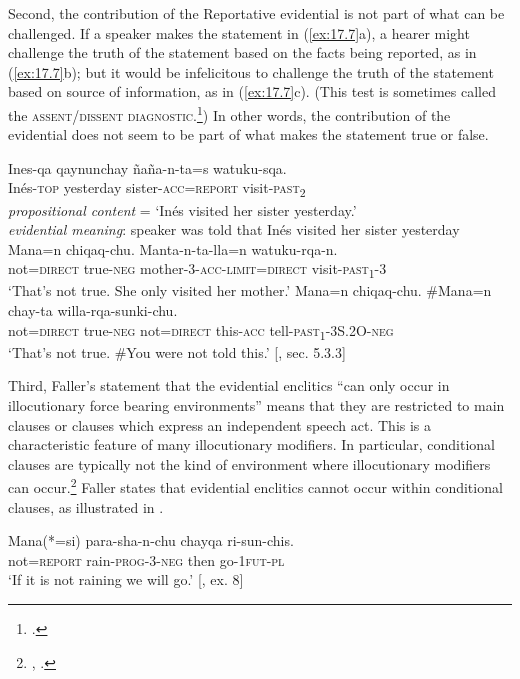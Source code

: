 Second, the contribution of the Reportative evidential is not part of what can be challenged. If a speaker makes the statement in (\ref{ex:17.7}a), a hearer might challenge the truth of the statement based on the facts being reported, as in (\ref{ex:17.7}b); but it would be infelicitous to challenge the truth of the statement based on source of information, as in (\ref{ex:17.7}c). (This test is sometimes called the \textsc{assent/dissent diagnostic}.\footnote{\citet{Papafragou2006}.}) In other words, the contribution of the evidential does not seem to be part of what makes the statement true or false.


\ea \label{ex:17.7}
\ea 
\gll Ines-qa  qaynunchay  ñaña-n-ta=s  watuku-sqa.\\
Inés-\textsc{top}  yesterday  sister-\textsc{acc}=\textsc{report}  visit\textsc{-past}\textsc{\textsubscript{2}}\\
\glt \textit{propositional content} = ‘Inés visited her sister yesterday.’\\
\textit{evidential meaning}: speaker was told that Inés visited her sister yesterday
\ex \gll  Mana=n  chiqaq-chu.  Manta-n-ta-lla=n  watuku-rqa-n.\\
not=\textsc{direct}  true-\textsc{neg}  mother-3-\textsc{acc}-\textsc{limit}=\textsc{direct}  visit-\textsc{past\textsubscript{1}}-3\\
\glt ‘That’s not true. She only visited her mother.’
\ex \gll  Mana=n  chiqaq-chu.  \#Mana=n  chay-ta  willa-rqa-sunki-chu.\\
not=\textsc{direct}  true-\textsc{neg}  not=\textsc{direct}  this-\textsc{acc}  tell\textsc{-past}\textsc{\textsubscript{1}}-3S.2O-\textsc{neg}\\
\glt ‘That’s not true. \#You were not told this.’  [\citealt{Faller2002}, sec. 5.3.3]
\z \z


Third, Faller’s statement that the evidential enclitics “can only occur in illocutionary force bearing environments” means that they are restricted to main clauses or clauses which express an independent speech act. This is a characteristic feature of many illocutionary modifiers. In particular, conditional clauses are typically not the kind of environment where illocutionary modifiers can occur.\footnote{\citet{Ernst2009}, \citet{Haegeman2010a}.} Faller states that evidential enclitics cannot occur within conditional clauses, as illustrated in .


\ea \label{ex:17.8}
\gll Mana(*=si)  para-sha-n-chu  chayqa  ri-sun-chis.\\
not=\textsc{report}  rain-\textsc{prog}-3-\textsc{neg}  then  go-1\textsc{fut}-\textsc{pl}\\
\glt ‘If it is not raining we will go.’  [\citealt{Faller2003}, ex. 8]
\z



